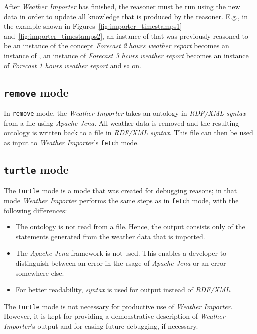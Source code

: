 After \emph{Weather Importer} has finished, the  reasoner must be run using the new data in order to update all knowledge that is produced by the reasoner. E.g., in the example shown in Figures~\ref{fig:importer_timestamps1} and~\ref{fig:importer_timestamps2}, an instance of  that was previously reasoned to be an instance of the concept \emph{Forecast 2 hours weather report} becomes an instance of , an instance of \emph{Forecast 3 hours weather report} becomes an instance of \emph{Forecast 1 hours weather report} and so on.

\subsection{\texttt{remove} mode}

In \texttt{remove} mode, the \emph{Weather Importer} takes an ontology in \emph{RDF/XML syntax} from a file using \emph{Apache Jena}. All weather data is removed and the resulting ontology is written back to a file in \emph{RDF/XML syntax}. This file can then be used as input to \emph{Weather Importer}'s \texttt{fetch} mode.

\subsection{\texttt{turtle} mode}
\label{subsec:importer_turtle}

The \texttt{turtle} mode is a mode that was created for debugging reasons; in that mode \emph{Weather Importer} performs the same steps as in \texttt{fetch} mode, with the following differences:
\begin{itemize}
  \item The \smarthomeweather ontology is not read from a file. Hence, the output consists only of the statements generated from the weather data that is imported.
  \item The \emph{Apache Jena} framework is not used. This enables a developer to distinguish between an error in the usage of \emph{Apache Jena} or an error somewhere else.
  \item For better readability, \emph{ syntax} is used for output instead of \emph{RDF/XML}.
\end{itemize}

The \texttt{turtle} mode is not necessary for productive use of \emph{Weather Importer}. However, it is kept for providing a demonstrative description of \emph{Weather Importer}'s output and for easing future debugging, if necessary.

